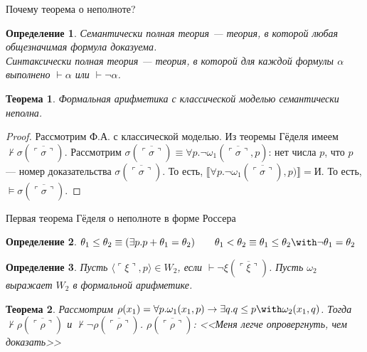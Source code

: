 \documentclass[aspectratio=169]{beamer}
\newtheorem{thm}{Теорема}[section]
\newtheorem{dfn}{Определение}[section]
\begin{document}
\begin{frame}{Почему теорема о неполноте?}
\begin{dfn}\emph{Семантически} полная теория --- теория, в которой любая общезначимая формула доказуема.\\
\emph{Синтаксически} полная теория --- теория, в которой для каждой формулы $\alpha$ выполнено $\vdash\alpha$ или $\vdash\neg\alpha$.\end{dfn}
\begin{thm}Формальная арифметика с классической моделью семантически неполна.\end{thm} \pause
\begin{proof}
 Рассмотрим Ф.А. с классической моделью. \pause
 Из теоремы Гёделя имеем $\not\vdash\sigma(\overline{\ulcorner\sigma\urcorner})$. \pause
 Рассмотрим $\sigma(\overline{\ulcorner\sigma\urcorner}) \equiv \forall p.\neg\omega_1(\overline{\ulcorner\sigma\urcorner},p)$:
нет числа $p$, что $p$ --- номер доказательства $\sigma(\overline{\ulcorner\sigma\urcorner})$. \pause 
 То есть, $\llbracket \forall p.\neg\omega_1(\overline{\ulcorner\sigma\urcorner}),p) \rrbracket = \text{И}$. \pause
 То есть, $\models \sigma(\overline{\ulcorner\sigma\urcorner})$.
\end{proof}

\end{frame}

\begin{frame}{Первая теорема Гёделя о неполноте в форме Россера}
\begin{dfn}$\theta_1\le\theta_2 \equiv (\exists p.p+\theta_1=\theta_2)\quad\quad\theta_1<\theta_2\equiv\theta_1\le\theta_2\with\neg\theta_1=\theta_2$\end{dfn}\pause
\begin{dfn}Пусть $\langle \ulcorner\xi\urcorner,p\rangle \in W_2$, если $\vdash\neg\xi(\overline{\ulcorner\xi\urcorner})$.
Пусть $\omega_2$ выражает $W_2$ в формальной арифметике.\end{dfn}\pause
\begin{thm}Рассмотрим $\rho(x_1) = \forall p.\omega_1(x_1,p)\rightarrow\exists q.q \le p \with \omega_2(x_1,q)$. \pause
Тогда $\not\vdash\rho(\overline{\ulcorner\rho\urcorner})$ и $\not\vdash\neg\rho(\overline{\ulcorner\rho\urcorner})$. \pause
$\rho(\overline{\ulcorner\rho\urcorner})$: <<Меня легче опровергнуть, чем доказать>>
\end{thm}%
\end{frame}
\end{document}
